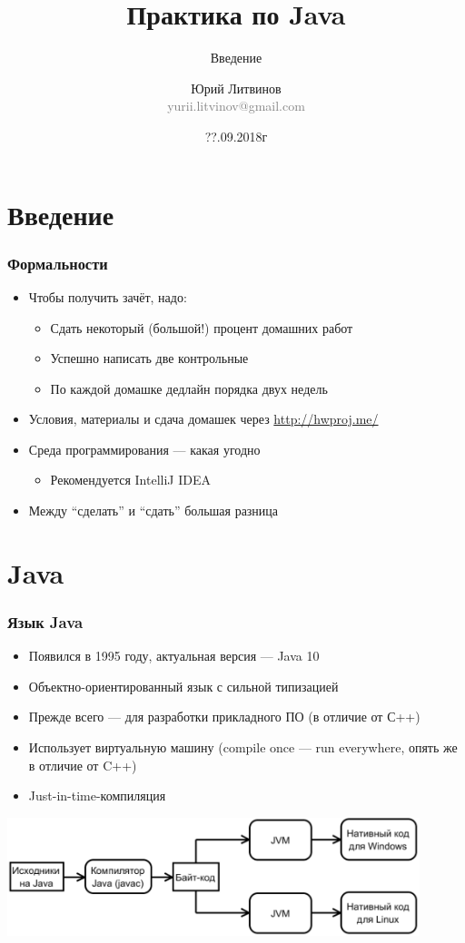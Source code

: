 \documentclass[xetex,mathserif,serif]{beamer}
\title{Практика по Java}
\subtitle{Введение}
\author[Юрий Литвинов]{Юрий Литвинов\\\small{\textcolor{gray}{yurii.litvinov@gmail.com}}}
\date{??.09.2018г}
\begin{document}
	\frame{\titlepage}

	\section{Введение}

	\begin{frame}
		\frametitle{Формальности}
		\begin{itemize}
			\item Чтобы получить зачёт, надо:
			\begin{itemize}
				\item Сдать некоторый (большой!) процент домашних работ
				\item Успешно написать две контрольные
				\item По каждой домашке дедлайн порядка двух недель
			\end{itemize}
			\item Условия, материалы и сдача домашек через \url{http://hwproj.me/}
			\item Среда программирования --- какая угодно
			\begin{itemize}
				\item Рекомендуется IntelliJ IDEA
			\end{itemize}
			\item Между ``сделать'' и ``сдать'' большая разница
		\end{itemize}
	\end{frame}

	\section{Java}

	\begin{frame}
		\frametitle{Язык Java}
		\begin{itemize}
			\item Появился в 1995 году, актуальная версия --- Java 10
			\item Объектно-ориентированный язык с сильной типизацией
			\item Прежде всего --- для разработки прикладного ПО (в отличие от С++)
			\item Использует виртуальную машину (compile once --- run everywhere, опять же в отличие от C++)
			\item Just-in-time-компиляция
		\end{itemize}
		\begin{center}
			\includegraphics[width=0.9\textwidth]{javaCompiling.png}
		\end{center}
	\end{frame}
\end{document}
